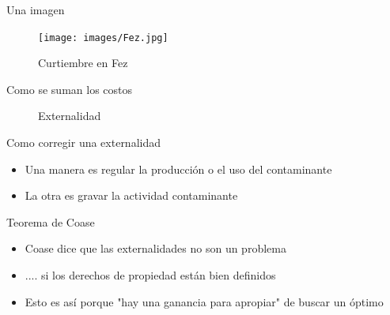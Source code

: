 \documentclass{beamer}
\begin{document}
\begin{frame}{Una imagen}
    

 \begin{figure} [h!]
    \centering
    \texttt{[image: images/Fez.jpg]}
    \caption{Curtiembre en Fez}
    \label{fig:}
\end{figure}

\end{frame}


\begin{frame}{Como se suman los costos}
    \begin{figure} [H]
\centering
{}
\caption{Externalidad}
\label{fig:21.1}
\end{figure} 

\end{frame}
 

\begin{frame}{Como corregir una externalidad}
    \begin{itemize}
        \item Una manera es regular la producción o el uso del contaminante
        \item La otra es gravar la actividad contaminante
    \end{itemize}
\end{frame}
  
\begin{frame}{Teorema de Coase}
    \begin{itemize}
        \item Coase dice que las externalidades no son un problema
        \item .... si los derechos de propiedad están bien definidos
        \item Esto es así porque "hay una ganancia para apropiar" de buscar un óptimo 
    \end{itemize}
\end{frame}
\end{document}
